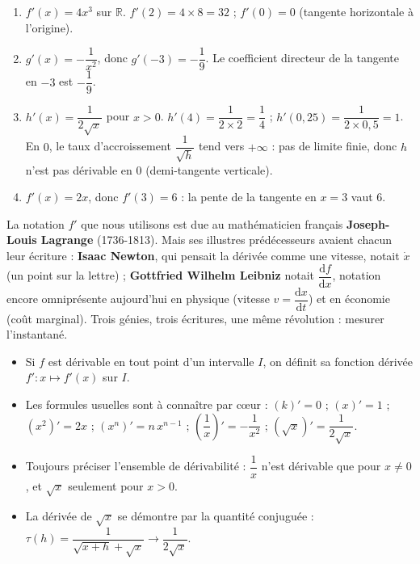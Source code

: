 \documentclass[11pt]{article}
\newcommand{\cle}[1]{{\popxbold\color{popdark}#1}}
\begin{document}
\begin{corrige}
\begin{enumerate}
\item $f'(x) = 4x^3$ sur $\mathbb{R}$. $f'(2) = 4 \times 8 = 32$ ; $f'(0) = 0$ (tangente horizontale à l'origine).
\item $g'(x) = -\dfrac{1}{x^2}$, donc $g'(-3) = -\dfrac{1}{9}$. Le coefficient directeur de la tangente en $-3$ est $-\dfrac{1}{9}$.
\item $h'(x) = \dfrac{1}{2\sqrt{x}}$ pour $x > 0$. $h'(4) = \dfrac{1}{2 \times 2} = \dfrac{1}{4}$ ; $h'(0{,}25) = \dfrac{1}{2 \times 0{,}5} = 1$. En $0$, le taux d'accroissement $\dfrac{1}{\sqrt{h}}$ tend vers $+\infty$ : pas de limite finie, donc $h$ n'est pas dérivable en $0$ (demi-tangente verticale).
\item $f'(x) = 2x$, donc $f'(3) = 6$ : la pente de la tangente en $x = 3$ vaut $6$.
\end{enumerate}
\end{corrige}

\begin{savaistu}
La notation $f'$ que nous utilisons est due au mathématicien français \textbf{Joseph-Louis Lagrange} (1736-1813). Mais ses illustres prédécesseurs avaient chacun leur écriture : \textbf{Isaac Newton}, qui pensait la dérivée comme une vitesse, notait $\dot{x}$ (un point sur la lettre) ; \textbf{Gottfried Wilhelm Leibniz} notait $\dfrac{\mathrm{d}f}{\mathrm{d}x}$, notation encore omniprésente aujourd'hui en physique (vitesse $v = \dfrac{\mathrm{d}x}{\mathrm{d}t}$) et en économie (coût marginal). Trois génies, trois écritures, une même révolution : mesurer l'instantané.
\end{savaistu}

\begin{aretenir}
\begin{itemize}
\item Si $f$ est dérivable en tout point d'un intervalle $I$, on définit sa \cle{fonction dérivée} $f' : x \mapsto f'(x)$ sur $I$.
\item Les formules usuelles sont à connaître par c\oe ur : $(k)'=0$ ; $(x)'=1$ ; $(x^2)'=2x$ ; $(x^n)' = n\,x^{n-1}$ ; $\left(\dfrac{1}{x}\right)' = -\dfrac{1}{x^2}$ ; $(\sqrt{x})' = \dfrac{1}{2\sqrt{x}}$.
\item Toujours préciser l'\cle{ensemble de dérivabilité} : $\dfrac{1}{x}$ n'est dérivable que pour $x \neq 0$, et $\sqrt{x}$ seulement pour $x > 0$.
\item La dérivée de $\sqrt{x}$ se démontre par la \cle{quantité conjuguée} : $\tau(h) = \dfrac{1}{\sqrt{x+h}+\sqrt{x}} \to \dfrac{1}{2\sqrt{x}}$.
\end{itemize}
\end{aretenir}
\end{document}
